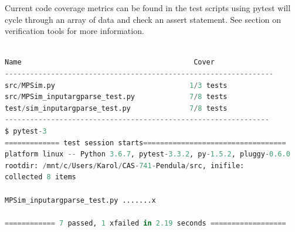 \documentclass[12pt, titlepage]{article}
\begin{document}
Current code coverage metrics can be found in the test scripts 
using pytest will cycle through an array of data and check an assert 
statement. See section on verification tools for more information.
\begin{lstlisting}[language=python, showstringspaces=false]

Name                                         Cover
----------------------------------------------------------------
src/MPSim.py                                1/3 tests
src/MPSim_inputargparse_test.py             7/8 tests
test/sim_inputargparse_test.py              7/8 tests
---------------------------------------------------------------
$ pytest-3
============= test session starts==================================
platform linux -- Python 3.6.7, pytest-3.3.2, py-1.5.2, pluggy-0.6.0
rootdir: /mnt/c/Users/Karol/CAS-741-Pendula/src, inifile:
collected 8 items

MPSim_inputargparse_test.py .......x                                                                                                                               [100%]

============ 7 passed, 1 xfailed in 2.19 seconds ==================
\end{lstlisting}




\end{document}

